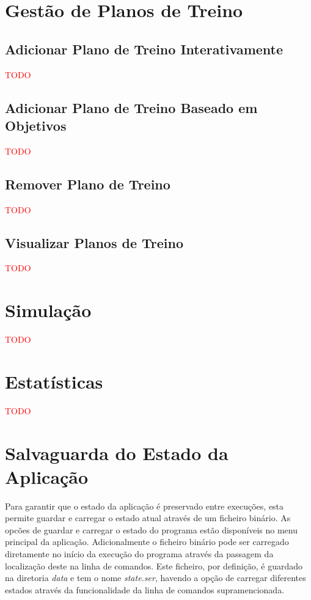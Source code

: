 \documentclass[a4paper,12pt]{scrreprt}
\begin{document}
\section{Gestão de Planos de Treino}
    \label{sec:gestao-planos-treino}
    \subsection{Adicionar Plano de Treino Interativamente}
    \textcolor{red}{TODO}
    \subsection{Adicionar Plano de Treino Baseado em Objetivos}
    \textcolor{red}{TODO}
    \subsection{Remover Plano de Treino}
    \textcolor{red}{TODO}
    \subsection{Visualizar Planos de Treino}
    \textcolor{red}{TODO}

\section{Simulação}
    \label{sec:simulacao}
    \textcolor{red}{TODO}

\section{Estatísticas}
    \label{sec:estatisticas}
    \textcolor{red}{TODO}

\clearpage
\section{Salvaguarda do Estado da Aplicação}
    \label{sec:salvaguarda-estado}
Para garantir que o estado da aplicação é preservado entre execuções, esta
permite guardar e carregar o estado atual através de um ficheiro binário.
As opcões de guardar e carregar o estado do programa estão disponíveis no menu principal da aplicação. Adicionalmente o ficheiro binário pode ser carregado diretamente no início da execução do programa através da passagem da localização deste na linha de comandos.
Este ficheiro, por definição, é guardado na diretoria \textit{data} e tem o nome \textit{state.ser}, havendo a opção de carregar diferentes estados através da funcionalidade da linha de comandos supramencionada.
\end{document}
